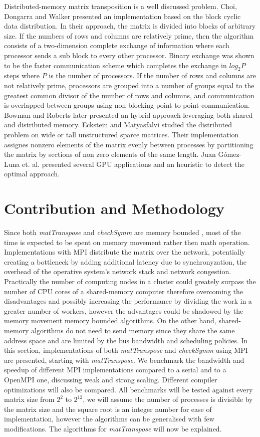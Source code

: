\documentclass[conference]{IEEEtran}
\begin{document}
\fi

Distributed-memory matrix transposition is a well discussed problem.
Choi, Dongarra and Walker \cite{b3} presented an implementation
based on the block cyclic data distribution. In their approach, the
matrix is divided into blocks of arbitrary size. If the numbers of rows and
columns are relatively prime, then the algorithm consists of a two-dimension
complete exchange of information where each processor sends a sub block
to every other processor. Binary exchange was shown to be the faster communication
scheme \cite{b4} which completes the exchange in $log_2 P$ steps where
$P$ is the number of processors. If the number of rows and columns
are not relatively prime, processors are grouped into a number of groups
equal to the greatest common divisor of the number of rows and columns, and
communication is overlapped between groups using
non-blocking point-to-point communication. Bowman and Roberts \cite{b5} later
presented an hybrid approach leveraging both shared and distributed memory.
Eckstein and Matyasfalvi
\cite{b6} studied the distributed problem on wide or tall unstructured sparce matrices.
Their implementation assignes nonzero elements of the matrix evenly
between processes by partitioning the matrix by sections of non zero
elements of the same length. Juan Gómez-Luna et. al. \cite{b7} presented
several GPU applications and an heuristic to detect the optimal approach.

\section{Contribution and Methodology}

Since both \textit{matTranspose} and \textit{checkSymm} are memory bounded
\cite{b10}, most of the time is expected to be spent on memory movement rather then
math operation. Implementations with MPI distribute the matrix over the network,
potentially creating a bottleneck by adding additional latency due to
synchronyzation, the overhead of the operative system's network stack and
network congestion. Practically the number of computing nodes
in a cluster could greately surpass the number of CPU cores of a
shared-memory computer therefore overcoming the disadvantages and
possibly increasing the performance by dividing the work in a greater
number of workers, however the advantages could be shadowed by the
memory movement memory bounded algorithms. On the other hand, shared-memory
algorithms do not need to send memory since they share the same address
space and are limited by the bus bandwidth and scheduling policies.
In this section, implementations of both \textit{matTranspose}
and \textit{checkSymm} using MPI are presented, starting with
\textit{matTranspose}. We benchmark the bandwidth and speedup
of different MPI implementations compared to a serial and to a OpenMPI one,
discussing weak and strong scaling. Different compiler optimizations
will also be compared. All benchmarks will be tested against every
matrix size from $2^2$ to $2^{12}$, we will assume the number of processes
is divisible by the matrix size and the square root is an integer
number for ease of implementation, however the algorithms can be
generalised with few modifications. The algorithms for \textit{matTranspose}
will now be explained.
\end{document}
